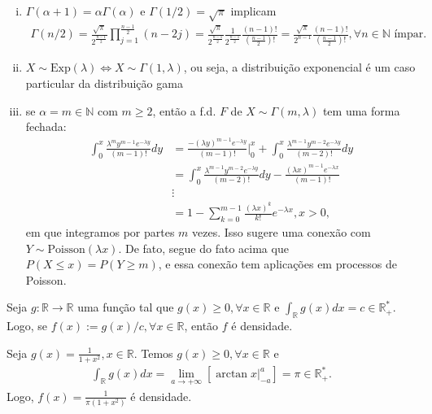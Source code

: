 \documentclass[../Notas.tex]{subfiles}
\begin{document}
\begin{example}
\begin{enumerate}[(i)]
    \item $\Gamma(\alpha + 1) = \alpha\Gamma(\alpha)$ e $\Gamma(1/2) = \sqrt{\pi}$ implicam
    \begin{align*}
        \Gamma(n/2) = \frac{ \sqrt{\pi} }{ 2^{\frac{n-1}{2}} } \prod_{j=1}^{\frac{n-1}{2}} (n-2j) = \frac{ \sqrt{\pi} }{ 2^{\frac{n-1}{2}} }\frac{1}{2^{\frac{n-1}{2}}}\frac{(n-1)!}{\left( \frac{n-1}{2} \right)!} = \frac{ \sqrt{\pi} }{ 2^{n-1} }\frac{(n-1)!}{\left( \frac{n-1}{2} \right)!}, \forall n\in\mathbb{N} \text{ ímpar.}
    \end{align*}
    \item $X\sim\text{Exp}(\lambda)\iff X\sim\Gamma(1, \lambda)$, ou seja, a distribuição exponencial é um caso particular da distribuição gama
    \item se $\alpha = m \in\mathbb{N}$ com $m\geq 2$, então a f.d. $F$ de $X\sim\Gamma(m,\lambda)$ tem uma forma fechada:
    \begin{align*}
        \int_{0}^x \frac{ \lambda^m y^{m-1} e^{-\lambda y} }{(m-1)!} dy &= \frac{ -(\lambda y)^{m-1} e^{-\lambda y} }{(m-1)!}\Big|_{0}^{x} + \int_{0}^x \frac{ \lambda^{m-1} y^{m-2} e^{-\lambda y} }{ (m-2)! } dy \\
        &= \int_{0}^x \frac{ \lambda^{m-1} y^{m-2} e^{-\lambda y} }{ (m-2)! } dy - \frac{ (\lambda x)^{m-1} e^{-\lambda x} }{(m-1)!} \\
        &\vdots \\
        &= 1 - \sum_{k=0}^{m-1} \frac{ (\lambda x)^k }{k!}e^{-\lambda x}, x>0,
    \end{align*}
    em que integramos por partes $m$ vezes. Isso sugere uma conexão com $Y\sim\text{Poisson}(\lambda x)$. De fato, segue do fato acima que $P(X\leq x) = P(Y\geq m)$, e essa conexão tem aplicações em processos de Poisson.
\end{enumerate}
\end{example}

\begin{remark}
Seja $g:\mathbb{R}\to\mathbb{R}$ uma função tal que $g(x)\geq 0, \forall x\in\mathbb{R}$ e $\displaystyle{ \int_{\mathbb{R}} g(x) dx = c\in\mathbb{R}^{*}_{+} }$. Logo, se $f(x) := g(x)/c, \forall x\in\mathbb{R}$, então $f$ é densidade.
\begin{example}
Seja $g(x) = \displaystyle{ \frac{1}{1+x^2}, x\in\mathbb{R} }$. Temos $g(x)\geq 0, \forall x\in\mathbb{R}$ e 
\begin{align*}
    \int_{\mathbb{R}} g(x) dx = \lim_{a\to +\infty} \left[ \arctan x \Big|_{-a}^{a} \right] = \pi\in\mathbb{R}^*_+.
\end{align*}
Logo, $f(x) = \displaystyle{ \frac{1}{\pi(1 + x^2)} }$ é densidade.
\end{example}
\end{remark}
\end{document}
